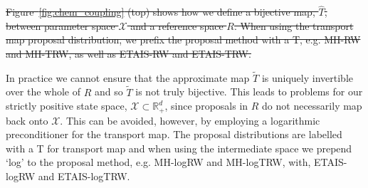 \documentclass[final]{siamltex}
\newcommand{\edit}[1]{{\color{red} #1}}  %
\newcommand\irregularcircle[2]{%
  \pgfextra {\pgfmathsetmacro\len{(#1)+rand*(#2)}}
  +(0:\len pt)
  \foreach \a in {10,20,...,350}{
    \pgfextra {\pgfmathsetmacro\len{(#1)+rand*(#2)}}
    -- +(\a:\len pt)
  } -- cycle
}
\providecommand{\DIFdel}[1]{{\protect\color{red}\sout{#1}}}                      %
\providecommand{\DIFaddbegin}{} %
\providecommand{\DIFaddend}{} %
\providecommand{\DIFdelbegin}{} %
\providecommand{\DIFdelend}{} %
\newcommand{\DIFscaledelfig}{0.5}
\newlength{\DIFdelgraphicswidth} %
\newlength{\DIFdelgraphicsheight} %
\newcommand{\DIFaddincludegraphics}[2][]{{\color{blue}\fbox{\DIFOincludegraphics[#1]{#2}}}} %
\newcommand{\DIFdelincludegraphics}[2][]{%
\sbox{\DIFdelgraphicsbox}{\DIFOincludegraphics[#1]{#2}}%
\settoboxwidth{\DIFdelgraphicswidth}{\DIFdelgraphicsbox} %
\settoboxtotalheight{\DIFdelgraphicsheight}{\DIFdelgraphicsbox} %
\scalebox{\DIFscaledelfig}{%
\parbox[b]{\DIFdelgraphicswidth}{\usebox{\DIFdelgraphicsbox}\\[-\baselineskip] \rule{\DIFdelgraphicswidth}{0em}}\llap{\resizebox{\DIFdelgraphicswidth}{\DIFdelgraphicsheight}{%
\setlength{\unitlength}{\DIFdelgraphicswidth}%
\begin{picture}(1,1)%
\thicklines\linethickness{2pt} %
{\color[rgb]{1,0,0}\put(0,0){\framebox(1,1){}}}%
{\color[rgb]{1,0,0}\put(0,0){\line( 1,1){1}}}%
{\color[rgb]{1,0,0}\put(0,1){\line(1,-1){1}}}%
\end{picture}%
}\hspace*{3pt}}} %
} %
\DeclareRobustCommand{\DIFaddbegin}{\DIFOaddbegin \let\includegraphics\DIFaddincludegraphics} %
\DeclareRobustCommand{\DIFaddend}{\DIFOaddend \let\includegraphics\DIFOincludegraphics} %
\DeclareRobustCommand{\DIFdelbegin}{\DIFOdelbegin \let\includegraphics\DIFdelincludegraphics} %
\DeclareRobustCommand{\DIFdelend}{\DIFOaddend \let\includegraphics\DIFOincludegraphics} %
\begin{document}
\DIFdelbegin \DIFdel{Figure~\ref{fig:chem_coupling} (top) shows how we define a bijective map,
$\hat{T}$, between parameter space $\mathcal{X}$ and a reference space
$R$. When using the transport map proposal distribution, we prefix the proposal method with a T, e.g. MH-RW  and MH-TRW, as well as ETAIS-RW and ETAIS-TRW. }\DIFdelend %
\DIFaddbegin 










\DIFaddend In practice we cannot ensure that the approximate map $\tilde{T}$
is uniquely invertible over the whole of $R$ and so $\tilde{T}$ is not
truly bijective. This leads to problems for our strictly positive
state space, $\mathcal{X} \subset \mathbb{R}_+^d$, since proposals in
$R$ do not necessarily map back onto $\mathcal{X}$. \DIFaddbegin \edit{This can be
  avoided, however, by employing a logarithmic preconditioner for the
  transport map. The proposal distributions are labelled with a T for transport map and when using the intermediate space we prepend `log' to the proposal method, e.g. MH-logRW and MH-logTRW, with, ETAIS-logRW and ETAIS-logTRW.}
\DIFaddend 
\end{document}
